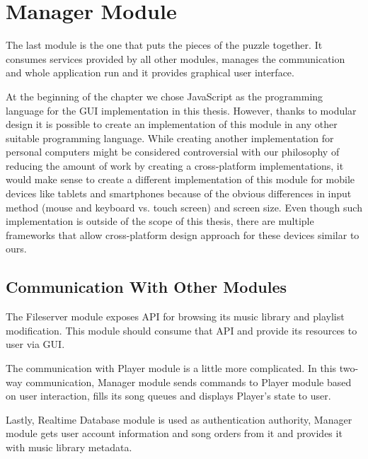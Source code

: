 \section {Manager Module}

The last module is the one that puts the pieces of the puzzle together. It consumes services provided by all other modules, manages the communication and whole application run and it provides graphical user interface. 
\par
At the beginning of the chapter we chose JavaScript as the programming language for the GUI implementation in this thesis. However, thanks to modular design it is possible to create an implementation of this module in any other suitable programming language. While creating another implementation for personal computers might be considered controversial with our philosophy of reducing the amount of work by creating a cross-platform implementations, it would make sense to create a different implementation of this module for mobile devices like tablets and smartphones because of the obvious differences in input method (mouse and keyboard vs. touch screen) and screen size. Even though such implementation is outside of the scope of this thesis, there are multiple frameworks that allow cross-platform design approach for these devices similar to ours.

\subsection {Communication With Other Modules}

The Fileserver module exposes API for browsing its music library and playlist modification. This module should consume that API and provide its resources to user via GUI.
\par
The communication with Player module is a little more complicated. In this two-way communication, Manager module sends commands to Player module based on user interaction, fills its song queues and displays Player's state to user. 
\par
Lastly, Realtime Database module is used as authentication authority, Manager module gets user account information and song orders from it and provides it with music library metadata.
